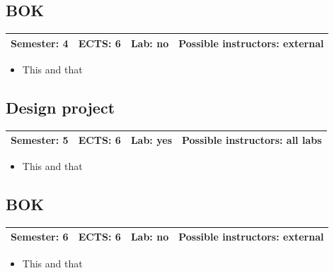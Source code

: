 \documentclass[12pt,twoside,fleqn,a4paper]{article}
\begin{document}
\subsection{BOK}
\begin{tabular}{llll} \hline
\textbf{Semester:} 4 & \textbf{ECTS:} 6 & \textbf{Lab:} no & \textbf{Possible instructors:} external\\
\hline
\end{tabular}

\begin{itemize}
\setlength\itemsep{0cm}
\item This and that
\end{itemize}


\subsection{Design project}
\begin{tabular}{llll} \hline
\textbf{Semester:} 5 & \textbf{ECTS:} 6 & \textbf{Lab:} yes & \textbf{Possible instructors:} all labs\\
\hline
\end{tabular}

\begin{itemize}
\setlength\itemsep{0cm}
\item This and that
\end{itemize}


\subsection{BOK}
\begin{tabular}{llll} \hline
\textbf{Semester:} 6 & \textbf{ECTS:} 6 & \textbf{Lab:} no & \textbf{Possible instructors:} external\\
\hline
\end{tabular}

\begin{itemize}
\setlength\itemsep{0cm}
\item This and that
\end{itemize}
\end{document}
